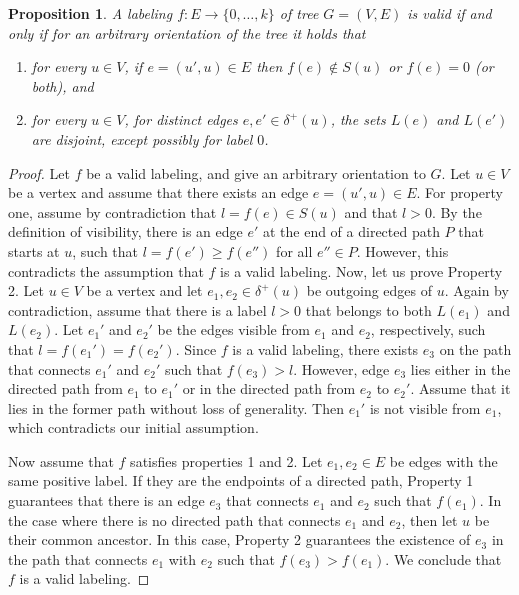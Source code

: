 \documentclass[11pt]{article}
\newtheorem{proposition}{Proposition}[section]
\newcommand\+{\mkern2mu}
\begin{document}
\begin{proposition} \label{prop: visibility}
    \label{prop:equiv1}
A labeling $f:E \to \{0, \ldots, k\}$ of tree $G=(V, E)$ is valid if and only if for an arbitrary orientation of the tree it holds that
    \begin{enumerate}
        \item for every $u \in V$, if $e=(u', u) \in E$ then $f(e) \not \in S(u)$ or $f(e) = 0$ (or both), and
        \item for every $u \in V$, for distinct edges $e, e' \in \delta^+(u)$, the sets $L(e)$ and $L(e')$ are disjoint, except possibly for label $0$.
    \end{enumerate}
\end{proposition}

\begin{proof}
    Let $f$ be a valid labeling, and give an arbitrary orientation to $G$. Let $u \in V$ be a vertex and assume that there exists an edge $e=(u', u) \in E$. For property one, assume by contradiction that $l = f(e) \in S(u)$ and that $l > 0$. By the definition of visibility, there is an edge $e'$ at the end of a directed path $P$ that starts at $u$, such that $l = f(e') \geq f(e'')$ for all $e'' \in P$. However, this contradicts the assumption that $f$ is a valid labeling. Now, let us prove Property 2. Let $u \in V$ be a vertex and let $e_1, e_2 \in \delta^+(u)$ be outgoing edges of $u$. Again by contradiction, assume that there is a label $l>0$ that belongs to both $L(e_1)$ and $L(e_2)$. Let $e_1'$ and $e_2'$ be the edges visible from $e_1$ and $e_2$, respectively, such that $l = f(e_1') = f(e_2')$. Since $f$ is a valid labeling, there exists $e_3$ on the path that connects $e_1'$ and $e_2'$ such that $f(e_3)>l$. However, edge $e_3$ lies either in the directed path from $e_1$ to $e_1'$ or in the directed path from $e_2$ to $e_2'$. Assume that it lies in the former path without loss of generality. Then $e_1'$ is not visible from $e_1$, which contradicts our initial assumption. 

    Now assume that $f$ satisfies properties 1 and 2. Let $e_1, e_2 \in E$ be edges with the same positive label. If they are the endpoints of a directed path, Property 1 guarantees that there is an edge $e_3$ that connects $e_1$ and $e_2$ such that $f(e_1)$. In the case where there is no directed path that connects $e_1$ and $e_2$, then let $u$ be their common ancestor. In this case, Property 2 guarantees the existence of $e_3$ in the path that connects $e_1$ with $e_2$ such that $f(e_3) > f(e_1)$. We conclude that $f$ is a valid labeling.
\end{proof}
\end{document}
